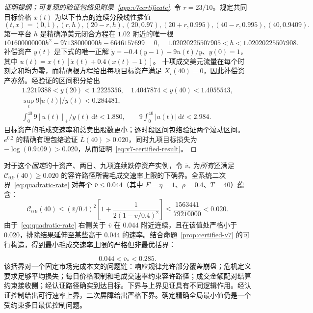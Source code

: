 \documentclass[11pt]{article}
\numberwithin{equation}{section}
\theoremstyle{definition}
\theoremstyle{remark}
\newcommand{\Cris}{\mathcal{C}}
\newcommand{\dd}{\,\mathrm{d}}
\begin{document}
\begin{proof}[证明提纲；可复现的验证包络见附录~\ref{app:v7certificate}]
令 $r=23/10$。规定共同目标价格 $x(t)$ 为以下节点的连续分段线性插值
\begin{equation}\label{eq:v7-knots}
(t,x)=(0,1),(r,h),(20-r,h),(20,0.97),(20+r,0.995),(40-r,0.995),(40,0.9409).
\end{equation}
第一平台 $h$ 是精确净美元闭合方程在 $1.02$ 附近的唯一根
\begin{equation}\label{eq:v7-root}
101600000000h^2-97138000000h-6646157699=0,
\quad1.02020225507905<h<1.02020225507908.
\end{equation}
补偿资产 $y(t)$ 是下式的唯一正解
$\dot y=-0.4(y-1)-9u(t)/y$、$y(0)=1$，其中
$u(t)=x(t)[\dot x(t)+0.4(x(t)-1)]$。
十项成交美元流量在每个时刻之和均为零，而精确根方程给出每项目标资产满足 $X_i(40)=0$，因此补偿资产亦然。经验证的区间积分给出
\begin{equation}\label{eq:v7-bounds}
\begin{gathered}
1.2219388<y(20)<1.2225356,\quad
1.4047874<y(40)<1.4055543,\\
\sup_t9|u(t)|/y(t)<0.284481,\\
\int_0^{40}9[u(t)]_+/y(t)\dd t<1.880,\qquad
9\int_0^{40}|u(t)|\dd t<2.984.
\end{gathered}
\end{equation}
目标资产的毛成交速率和总卖出股数更小；逐时段区间包络验证两个滚动区间。$e^{0.2}$ 的精确有理包络验证 $\overline L(40)>0.020$，同时九项目标损失为 $-\log(0.9409)>0.020$，从而证明~\eqref{eq:v7-certified-result}。
\end{proof}
对于这个\emph{固定}的十资产、两日、九项连续跌停资产实例，令 $\bar v_*$ 为\emph{所有}还满足 $\Cris_{0.9}(40)\ge0.020$ 的容许路径所需毛成交速率上限的下确界。全系统二次界~\eqref{eq:quadratic-rate} 对每个 $\bar v\le 0.044$（其中 $F=\eta=1$、$\rho=0.4$、$T=40$）蕴含：
\[
\Cris_{0.9}(40)\le (\bar v/0.4)^2
\left[1+\frac{1}{2(1-\bar v/0.4)^2}\right]
\le \frac{1563441}{79210000}<0.020.
\]
由于~\eqref{eq:quadratic-rate} 右侧关于 $\bar v$ 在 $0.044$ 附近连续，且在该值处严格小于 $0.020$，排除结果延伸至某些高于 $0.044$ 的速率。结合命题~\ref{prop:certified-v7} 的可行构造，得到最小毛成交速率上限的严格但非最优括界：

\begin{equation}\label{eq:v7-rate-bracket}
\boxed{\qquad 0.044<\bar v_*<0.285.\qquad}
\end{equation}
该括界对一个固定市场完成本文的问题链：响应规律允许部分覆盖崩盘；危机定义要求足够平均损失；每日价格限制和毛成交速率约束容许路径；成交金额配对结算约束接收侧；经认证路径确实到达目标。下界与上界见证具有不同逻辑作用。经认证控制给出可行速率上界，二次屏障给出严格下界。确定精确全局最小值仍是一个受约束多日最优控制问题。
\end{document}
